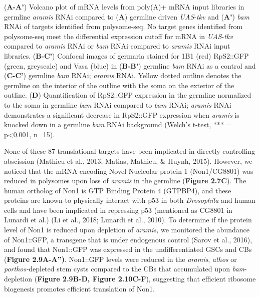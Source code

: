 \documentclass[12pt,oneside]{reedthesis}
\begin{document}

\setlength\parindent{0pt}(\textbf{A-A'}) Volcano plot of mRNA levels from poly(A)+ mRNA input libraries in germline \emph{aramis} RNAi compared to (\textbf{A}) germline driven \emph{UAS}-\emph{tkv} and (\textbf{A'}) \emph{bam} RNAi of targets identified from polysome-seq. No target genes identified from polysome-seq meet the differential expression cutoff for mRNA in \emph{UAS}-\emph{tkv} compared to \emph{aramis} RNAi or \emph{bam} RNAi compared to \emph{aramis} RNAi input libraries. (\textbf{B-C'}) Confocal images of germaria stained for 1B1 (red) RpS2::GFP (green, greyscale) and Vasa (blue) in (\textbf{B-B'}) germline \emph{bam} RNAi as a control and (\textbf{C-C'}) germline \emph{bam} RNAi; \emph{aramis} RNAi. Yellow dotted outline denotes the germline on the interior of the outline with the soma on the exterior of the outline. (\textbf{D}) Quantification of RpS2::GFP expression in the germline normalized to the soma in germline \emph{bam} RNAi compared to \emph{bam} RNAi; \emph{aramis} RNAi demonstrates a significant decrease in RpS2::GFP expression when \emph{aramis} is knocked down in a germline \emph{bam} RNAi background (Welch's t-test, *** = p\textless0.001, n=15).


\textbf{\hfill\break
}

None of these 87 translational targets have been implicated in directly controlling abscission (Mathieu et al., 2013; Matias, Mathieu, \& Huynh, 2015). However, we noticed that the mRNA encoding Novel Nucleolar protein 1 (Non1/CG8801) was reduced in polysomes upon loss of \emph{aramis} in the germline (\textbf{Figure 2.7C}). The human ortholog of Non1 is GTP Binding Protein 4 (GTPBP4), and these proteins are known to physically interact with p53 in both \emph{Drosophila} and human cells and have been implicated in repressing p53 (mentioned as CG8801 in Lunardi et al.) (Li et al., 2018; Lunardi et al., 2010). To determine if the protein level of Non1 is reduced upon depletion of \emph{aramis,} we monitored the abundance of Non1::GFP, a transgene that is under endogenous control (Sarov et al., 2016), and found that Non1::GFP was expressed in the undifferentiated GSCs and CBs (\textbf{Figure 2.9A-A'')}. Non1::GFP levels were reduced in the \emph{aramis}, \emph{athos} or \emph{porthos-}depleted stem cysts compared to the CBs that accumulated upon \emph{bam}-depletion (\textbf{Figure 2.9B-D, Figure 2.10C-F}), suggesting that efficient ribosome biogenesis promotes efficient translation of Non1.
\end{document}

